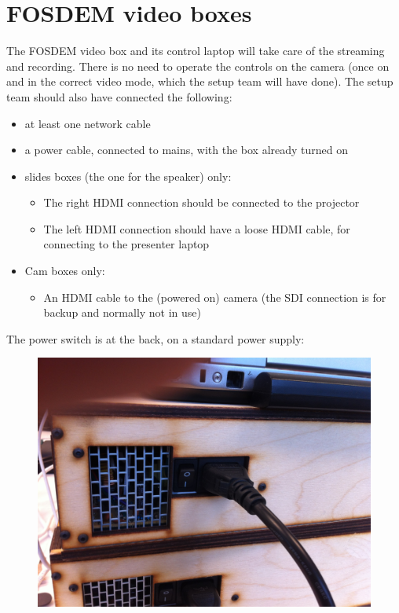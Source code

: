 \documentclass{article}
\begin{document}
\section{FOSDEM video boxes}
The FOSDEM video box and its control laptop will take care of the streaming and recording.
There is no need to operate the controls on the camera (once on and in the correct video mode, which the setup team will have done). The setup team should also have connected the following:
\begin{itemize}
  \item at least one network cable
  \item a power cable, connected to mains, with the box already turned on
  \item slides boxes (the one for the speaker) only:
    \begin{itemize}
      \item The right HDMI connection should be connected to the projector
      \item The left HDMI connection should have a loose HDMI cable, for connecting to the presenter laptop
    \end{itemize}
  \item Cam boxes only:
    \begin{itemize}
      \item An HDMI cable to the (powered on) camera (the SDI connection is for backup and normally not in use)
    \end{itemize}
\end{itemize}

The power switch is at the back, on a standard power supply:
\begin{figure}[H]
  \centering
  \includegraphics[width = 120mm]{videobox_psu.jpg}
\end{figure}
\end{document}
